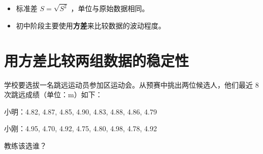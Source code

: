 \begin{keytakeaway}


\begin{itemize}
  \item 标准差 $S = \sqrt{S^2}$ ，单位与原始数据相同。
  \item 初中阶段主要使用\textbf{方差}来比较数据的波动程度。
\end{itemize}


\end{keytakeaway}



\section*{用方差比较两组数据的稳定性}


\begin{explore}


学校要选拔一名跳远运动员参加区运动会。从预赛中挑出两位候选人，他们最近 8 次跳远成绩（单位：m）如下：

小明：4.82, 4.87, 4.85, 4.90, 4.83, 4.88, 4.86, 4.79

小刚：4.95, 4.70, 4.92, 4.75, 4.80, 4.98, 4.78, 4.92

教练该选谁？

\end{explore}

